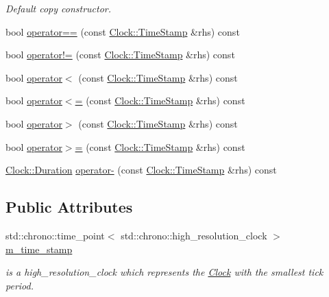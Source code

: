 \begin{DoxyCompactItemize}
\begin{DoxyCompactList}\small\item\em Default copy constructor. \end{DoxyCompactList}\item 
bool \hyperlink{class_clock_1_1_time_stamp_aa8fa25595ceb6d8300a31a475eeba2b7}{operator==} (const \hyperlink{class_clock_1_1_time_stamp}{Clock\+::\+Time\+Stamp} \&rhs) const 
\item 
bool \hyperlink{class_clock_1_1_time_stamp_a1786b6d74147561e4a4885d1a331c739}{operator!=} (const \hyperlink{class_clock_1_1_time_stamp}{Clock\+::\+Time\+Stamp} \&rhs) const 
\item 
bool \hyperlink{class_clock_1_1_time_stamp_af3226e1751b8863a17f344f70140818e}{operator$<$} (const \hyperlink{class_clock_1_1_time_stamp}{Clock\+::\+Time\+Stamp} \&rhs) const 
\item 
bool \hyperlink{class_clock_1_1_time_stamp_ab996a7b3a3263f910fe9ab2dcc898086}{operator$<$=} (const \hyperlink{class_clock_1_1_time_stamp}{Clock\+::\+Time\+Stamp} \&rhs) const 
\item 
bool \hyperlink{class_clock_1_1_time_stamp_a1cfe16526337665c231ed0d94d065c60}{operator$>$} (const \hyperlink{class_clock_1_1_time_stamp}{Clock\+::\+Time\+Stamp} \&rhs) const 
\item 
bool \hyperlink{class_clock_1_1_time_stamp_a17898988ef47d11f1accad6bf58c9d8c}{operator$>$=} (const \hyperlink{class_clock_1_1_time_stamp}{Clock\+::\+Time\+Stamp} \&rhs) const 
\item 
\hyperlink{class_clock_1_1_duration}{Clock\+::\+Duration} \hyperlink{class_clock_1_1_time_stamp_a4b876a2d43a8da209174123cfcd77218}{operator-\/} (const \hyperlink{class_clock_1_1_time_stamp}{Clock\+::\+Time\+Stamp} \&rhs) const 
\end{DoxyCompactItemize}
\subsection*{Public Attributes}
\begin{DoxyCompactItemize}
\item 
std\+::chrono\+::time\+\_\+point$<$ std\+::chrono\+::high\+\_\+resolution\+\_\+clock $>$ \hyperlink{class_clock_1_1_time_stamp_a6de590697ea903decd70a91bcc9d4a54}{m\+\_\+time\+\_\+stamp}\hypertarget{class_clock_1_1_time_stamp_a6de590697ea903decd70a91bcc9d4a54}{}\label{class_clock_1_1_time_stamp_a6de590697ea903decd70a91bcc9d4a54}

\begin{DoxyCompactList}\small\item\em is a high\+\_\+resolution\+\_\+clock which represents the \hyperlink{class_clock}{Clock} with the smallest tick period. \end{DoxyCompactList}\end{DoxyCompactItemize}
